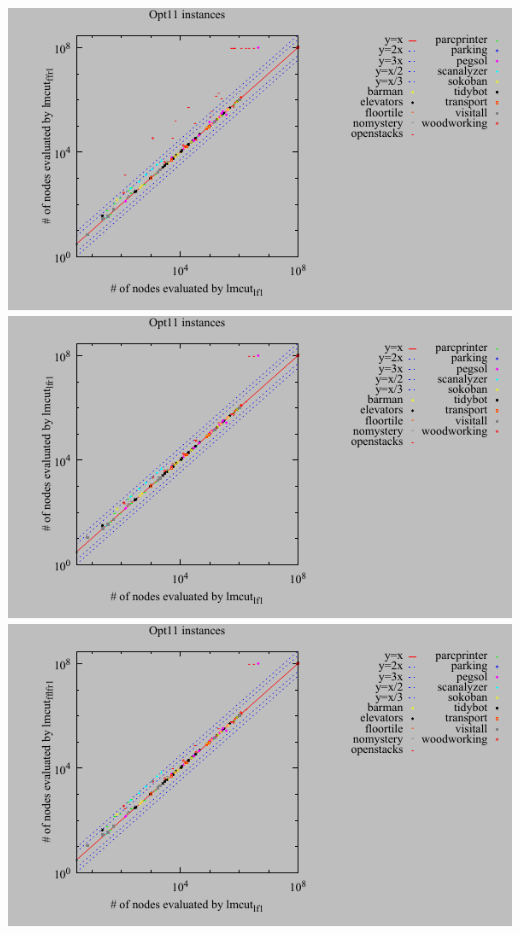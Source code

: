 \includegraphics{tables/opt11-evaluated-lmcut_lf-lmcut_ffr.pdf}
\linebreak
\includegraphics{tables/opt11-evaluated-lmcut_lf-lmcut_lfr.pdf}
\linebreak
\includegraphics{tables/opt11-evaluated-lmcut_lf-lmcut_fflfr.pdf}
\linebreak
